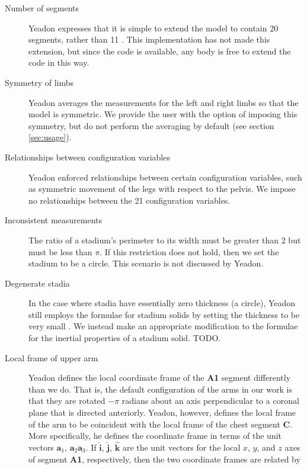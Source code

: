 \documentclass[10pt]{article}
\begin{document}
\begin{description}
    \item[Number of segments] Yeadon expresses that it is simple to extend the
        model to contain 20 segments, rather than 11 \cite{Yeadon1990f}. This
        implementation has not made this extension, but since the code is
        available, any body is free to extend the code in this way.
    \item[Symmetry of limbs] Yeadon averages the measurements for the left and
        right limbs so that the model is symmetric. We provide the user with
        the option of imposing this symmetry, but do not perform the averaging
        by default (see section \ref{sec:usage}).
    \item[Relationships between configuration variables] Yeadon enforced
        relationships between certain configuration variables, such as
        symmetric movement of the legs with respect to the pelvis. We impose no
        relationships between the 21 configuration variables.
    \item[Inconsistent measurements] The ratio of a stadium's perimeter to its
        width must be greater than 2 but must be less than $\pi$. If this
        restriction does not hold, then we set the stadium to be a circle. This
        scenario is not discussed by Yeadon.
    \item[Degenerate stadia] In the case where stadia have essentially zero
        thickness (a circle), Yeadon still employs the formulae for stadium
        solids by setting the thickness to be very small \cite{Yeadon1990f}. We
        instead make an appropriate modification to the formulae for the
        inertial properties of a stadium solid. TODO.
    \item[Local frame of upper arm] Yeadon defines the local coordinate frame
        of the \textbf{A1} segment differently than we do. That is, the default
        configuration of the arms in our work is that they are rotated $-\pi$
        radians about an axis perpendicular to a coronal plane that is directed
        anteriorly. Yeadon, however, defines the local frame of the arm to be
        coincident with the local frame of the chest segment \textbf{C}. More
        specifically, he defines the coordinate frame in terms of the unit
        vectors $\mathbf{a}_1$, $\mathbf{a}_2$$\mathbf{a}_3$. If
        $\mathbf{\hat{i}}$, $\mathbf{\hat{j}}$, $\mathbf{\hat{k}}$ are the unit
        vectors for the local $x$, $y$, and $z$ axes of segment \textbf{A1},
        respectively, then the two coordinate frames are related by
$$
\end{description}
\end{document}
